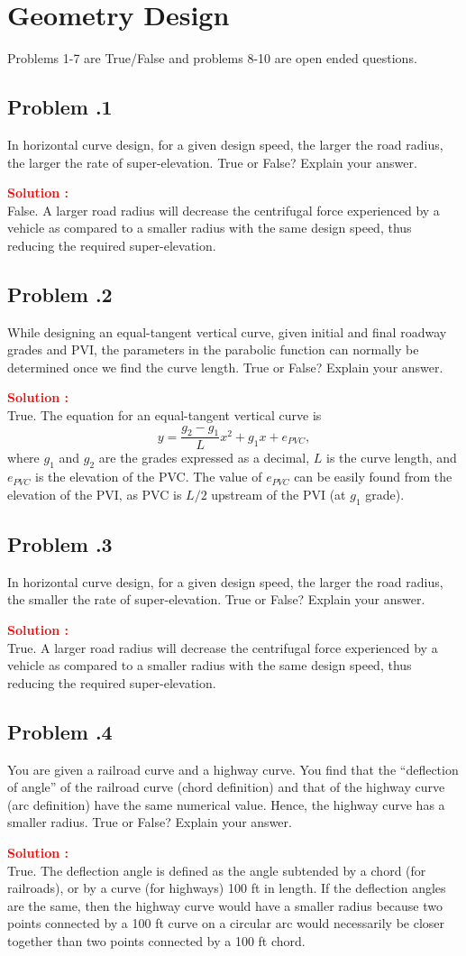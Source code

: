 \documentclass[12pt]{article}
\newcommand{\customsubsection}[1]{
  \subsection*{Problem \thesection.#1}
}
\begin{document}
\section{Geometry Design}
Problems 1-7 are True/False and problems 8-10 are open ended questions.


\customsubsection{1}
In horizontal curve design, for a given design speed, the larger the road radius, the larger the rate of super-elevation. True or False? Explain your answer. 


\textbf{\textcolor{red}{Solution :}} \\
False. A larger road radius will decrease the centrifugal force experienced by a vehicle as compared to a smaller radius with the same design speed, thus reducing the required super-elevation.
\newpage


\customsubsection{2}
While designing an equal-tangent vertical curve, given initial and final roadway grades and PVI, the parameters in the parabolic function can normally be determined once we find the curve length. True or False? Explain your answer. 


\textbf{\textcolor{red}{Solution :}} \\
True. The equation for an equal-tangent vertical curve is
\[
y = \frac{g_2-g_1}{L}x^2 + g_1x + e_{PVC},
\]
where $g_1$ and $g_2$ are the grades expressed as a decimal,
$L$ is the curve length, and $e_{PVC}$ is the elevation of the PVC. The value of $e_{PVC}$ can be easily found from the elevation of the PVI, as PVC is $L/2$ upstream of the PVI (at $g_1$ grade).
\newpage


\customsubsection{3}
In horizontal curve design, for a given design speed, the larger the road radius, the smaller the rate of super-elevation. True or False? Explain your answer. 


\textbf{\textcolor{red}{Solution :}} \\
True. A larger road radius will decrease the centrifugal force experienced by a vehicle as compared to a smaller radius with the same design speed, thus reducing the required super-elevation.
\newpage


\customsubsection{4}
You are given a railroad curve and a highway curve. You find that the “deflection of angle” of the railroad curve (chord definition) and that of the highway curve (arc definition) have the same numerical value. Hence, the highway curve has a smaller radius. True or False? Explain your answer. 


\textbf{\textcolor{red}{Solution :}} \\
True. The deflection angle is defined as the angle subtended by a chord (for railroads), or by a curve (for highways) 100 ft in length. If the deflection angles are the same, then the highway curve would have a smaller radius because two points connected by a 100 ft curve on a circular arc would necessarily be closer together than two points connected by a 100 ft chord.
\newpage
\end{document}
